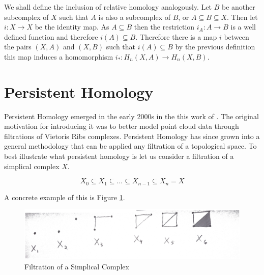 We shall define the inclusion of relative homology analogously. Let $B$ be another subcomplex of $X$ such that $A$ is also a subcomplex of $B$, or $A \subseteq B \subseteq X$. Then let $i : X \to X$ be the identity map. As $A \subseteq B$ then the restriction $i_A: A \to B$ is a well defined function and therefore $i(A) \subseteq B$. Therefore there is a map $i$ between the pairs $(X, A)$ and $(X, B)$ such that $i(A) \subseteq B$ by the previous definition this map induces a homomorphism $i_* : H_n(X, A) \to H_n(X, B)$.



\section{Persistent Homology}


Persistent Homology emerged in the early 2000s in the this work of \cite{persistence-original}. The original motivation for introducing it was to better model point cloud data through filtrations of Vietoris Ribs complexes. Persistent Homology has since grown into a general methodology that can be applied any filtration of a topological space. To best illustrate what persistent homology is let us consider a filtration of a simplical complex $X$. 

$$ X_0 \subseteq X_1 \subseteq ... \subseteq X_{n-1} \subseteq X_n = X$$

A concrete example of this is Figure \ref{fig:filt-sc}.


\begin{figure}%
    \centering
    \includegraphics[scale=0.085]{./images/chapter4/example-filtration.eps}%
    \caption{Filtration of a Simplical Complex}%
    \label{fig:filt-sc}%
\end{figure}

